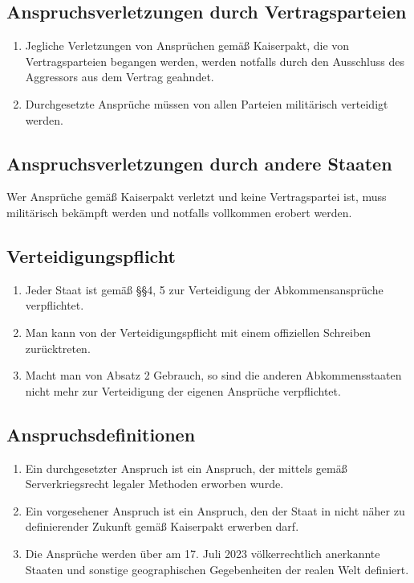 \documentclass{article}
\begin{document}
\subsection{Anspruchsverletzungen durch Vertragsparteien}
\begin{enumerate}[(1)]
    \item Jegliche Verletzungen von Ansprüchen gemäß Kaiserpakt, die von Vertragsparteien begangen werden, werden notfalls durch den Ausschluss des Aggressors aus dem Vertrag geahndet.
    \item Durchgesetzte Ansprüche müssen von allen Parteien militärisch verteidigt werden.
\end{enumerate}

\subsection{Anspruchsverletzungen durch andere Staaten}
Wer Ansprüche gemäß Kaiserpakt verletzt und keine Vertragspartei ist, muss militärisch bekämpft werden und notfalls vollkommen erobert werden.

\subsection{Verteidigungspflicht}
\begin{enumerate}[(1)]
    \item Jeder Staat ist gemäß §§4, 5 zur Verteidigung der Abkommensansprüche verpflichtet.
    \item Man kann von der Verteidigungspflicht mit einem offiziellen Schreiben zurücktreten.
    \item Macht man von Absatz 2 Gebrauch, so sind die anderen Abkommensstaaten nicht mehr zur Verteidigung der eigenen Ansprüche verpflichtet.
\end{enumerate}

\subsection{Anspruchsdefinitionen}
\begin{enumerate}[(1)]
    \item Ein durchgesetzter Anspruch ist ein Anspruch, der mittels gemäß Serverkriegsrecht legaler Methoden erworben wurde.
    \item Ein vorgesehener Anspruch ist ein Anspruch, den der Staat in nicht näher zu definierender Zukunft gemäß Kaiserpakt erwerben darf. 
    \item Die Ansprüche werden über am 17. Juli 2023 völkerrechtlich anerkannte Staaten und sonstige geographischen Gegebenheiten der realen Welt definiert.
\end{enumerate}
\end{document}
